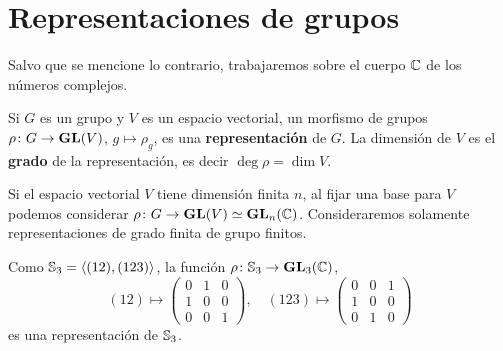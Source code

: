 \chapter{Representaciones de grupos}
\label{Representaciones}

Salvo que se mencione lo contrario, trabajaremos sobre el cuerpo $\mathbb{C}$ de los números complejos. 

\begin{definition}
Si $G$ es un grupo y $V$ es un espacio vectorial, 
un morfismo de grupos $\rho\colon G\to\mathbf{GL}(V)$, $g\mapsto\rho_g$, es una 
\textbf{representación} de $G$. La dimensión de $V$ es el \textbf{grado} 
de la representación, es decir $\deg\rho=\dim V$. 
\end{definition}

Si el espacio vectorial $V$ tiene dimensión finita $n$, al fijar una base 
para $V$ podemos considerar $\rho\colon G\to\mathbf{GL}(V)\simeq\mathbf{GL}_n(\mathbb{C})$. Consideraremos 
solamente representaciones de grado finita de grupo finitos.
 
\begin{example}
Como $\mathbb{S}_3=\langle (12),(123)\rangle$, la función $\rho\colon \mathbb{S}_3\to\mathbf{GL}_3(\mathbb{C})$,
\[
(12)\mapsto\begin{pmatrix}
0 & 1 & 0\\
1 & 0 & 0\\
0 & 0 & 1
\end{pmatrix},\quad
(123)\mapsto\begin{pmatrix}
0 & 0 & 1\\
1 & 0 & 0\\
0 & 1 & 0
\end{pmatrix}
\] 
es una representación de $\mathbb{S}_3$. 
\end{example}


